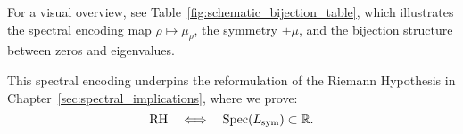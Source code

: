 For a visual overview, see Table~\ref{fig:schematic_bijection_table}, which illustrates the spectral encoding map \( \rho \mapsto \mu_\rho \), the symmetry \( \pm \mu \), and the bijection structure between zeros and eigenvalues.

\medskip
\noindent
This spectral encoding underpins the reformulation of the Riemann Hypothesis in Chapter~\ref{sec:spectral_implications}, where we prove:
\[
\mathrm{RH} \quad \Longleftrightarrow \quad \operatorname{Spec}(L_{\mathrm{sym}}) \subset \mathbb{R}.
\]
